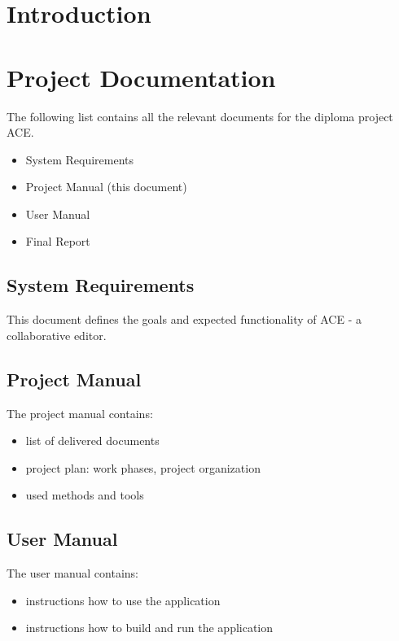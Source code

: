 \documentclass[11pt,a4paper]{article}
\begin{document}
\setlength{\parindent}{0pt}



\tableofcontents

\newpage

\section{Introduction}

\section{Project Documentation}
The following list contains all the relevant documents for the diploma project ACE.
\begin{itemize}
 \item System Requirements
 \item Project Manual (this document)
 \item User Manual
 \item Final Report
\end{itemize}

\subsection{System Requirements}
This document defines the goals and expected functionality of ACE - a collaborative editor.

\subsection{Project Manual}
The project manual contains:
\begin{itemize}
 \item list of delivered documents
 \item project plan: work phases, project organization
 \item used methods and tools
\end{itemize}

\subsection{User Manual}
The user manual contains:
\begin{itemize}
 \item instructions how to use the application
 \item instructions how to build and run the application
\end{itemize}
\end{document}
